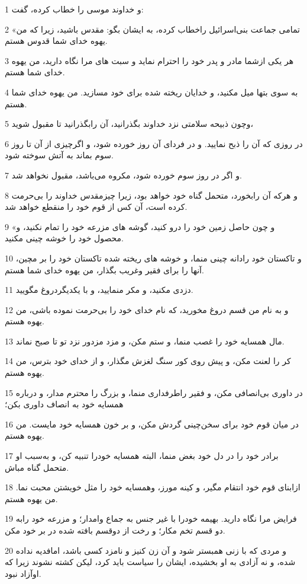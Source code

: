 \par 1 و خداوند موسی را خطاب کرده، گفت:
\par 2 «تمامی جماعت بنی‌اسرائیل راخطاب کرده، به ایشان بگو: مقدس باشید، زیرا که من یهوه خدای شما قدوس هستم.
\par 3 هر یکی ازشما مادر و پدر خود را احترام نماید و سبت های مرا نگاه دارید، من یهوه خدای شما هستم.
\par 4 به سوی بتها میل مکنید، و خدایان ریخته شده برای خود مسازید. من یهوه خدای شما هستم.
\par 5 وچون ذبیحه سلامتی نزد خداوند بگذرانید، آن رابگذرانید تا مقبول شوید،
\par 6 در روزی که آن را ذبح نمایید. و در فردای آن روز خورده شود، و اگرچیزی از آن تا روز سوم بماند به آتش سوخته شود.
\par 7 و اگر در روز سوم خورده شود، مکروه می‌باشد، مقبول نخواهد شد.
\par 8 و هر‌که آن رابخورد، متحمل گناه خود خواهد بود، زیرا چیزمقدس خداوند را بی‌حرمت کرده است، آن کس از قوم خود را منقطع خواهد شد.
\par 9 «و چون حاصل زمین خود را درو کنید، گوشه های مزرعه خود را تمام نکنید، و محصول خود را خوشه چینی مکنید.
\par 10 و تاکستان خود رادانه چینی منما، و خوشه های ریخته شده تاکستان خود را بر مچین، آنها را برای فقیر وغریب بگذار، من یهوه خدای شما هستم.
\par 11 دزدی مکنید، و مکر منمایید، و با یکدیگردروغ مگویید.
\par 12 و به نام من قسم دروغ مخورید، که نام خدای خود را بی‌حرمت نموده باشی، من یهوه هستم.
\par 13 مال همسایه خود را غصب منما، و ستم مکن، و مزد مزدور نزد تو تا صبح نماند.
\par 14 کر را لعنت مکن، و پیش روی کور سنگ لغزش مگذار، و از خدای خود بترس، من یهوه هستم.
\par 15 در داوری بی‌انصافی مکن، و فقیر راطرفداری منما، و بزرگ را محترم مدار، و درباره همسایه خود به انصاف داوری بکن؛
\par 16 در میان قوم خود برای سخن‌چینی گردش مکن، و بر خون همسایه خود مایست. من یهوه هستم.
\par 17 برادر خود را در دل خود بغض منما، البته همسایه خودرا تنبیه کن، و به‌سبب او متحمل گناه مباش.
\par 18 ازابنای قوم خود انتقام مگیر، و کینه مورز، وهمسایه خود را مثل خویشتن محبت نما. من یهوه هستم.
\par 19 فرایض مرا نگاه دارید. بهیمه خودرا با غیر جنس به جماع وامدار؛ و مزرعه خود رابه دو قسم تخم مکار؛ و رخت از دوقسم بافته شده در بر خود مکن.
\par 20 و مردی که با زنی همبستر شود و آن زن کنیز و نامزد کسی باشد، امافدیه نداده شده، و نه آزادی به او بخشیده، ایشان را سیاست باید کرد، لیکن کشته نشوند زیرا که اوآزاد نبود.
